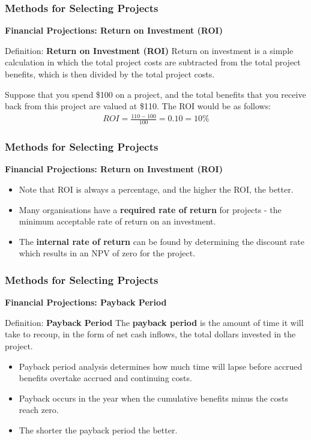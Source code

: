 \documentclass{beamer}
\begin{document}
\begin{frame}
\frametitle{Methods for Selecting Projects}
\textbf{Financial Projections: Return on Investment (ROI)}\\
\vspace{0.5cm}
\begin{block}{Definition: \textbf{Return on Investment (ROI)}}
Return on investment is a simple calculation in which the total project costs are subtracted from the total project benefits, which is then divided by the total project costs.
\end{block}
\vspace{0.5cm}
\begin{example}
Suppose that you spend \$100 on a project, and the total benefits that you receive back from this project are valued at \$110. The ROI would be as follows:
\begin{align*}
ROI = \frac{110 - 100}{100} = 0.10 = 10\%
\end{align*}
\end{example}
\end{frame}
\begin{frame}
\frametitle{Methods for Selecting Projects}
\textbf{Financial Projections: Return on Investment (ROI)}\\
\vspace{0.5cm}
\begin{itemize}
\item Note that ROI is always a percentage, and the higher the ROI, the better.
\item Many organisations have a \textbf{required rate of return} for projects - the minimum acceptable rate of return on an investment.
\item The \textbf{internal rate of return} can be found by determining the discount rate which results in an NPV of zero for the project.
\end{itemize}
\end{frame}
\begin{frame}
\frametitle{Methods for Selecting Projects}
\textbf{Financial Projections: Payback Period}\\
\vspace{0.5cm}
\begin{block}{Definition: \textbf{Payback Period}}
The \textbf{payback period} is the amount of time it will take to recoup, in the form of net cash inflows, the total dollars invested in the project.
\end{block}
\vspace{0.5cm}
\begin{itemize}
\item Payback period analysis determines how much time will lapse before accrued benefits overtake accrued and continuing costs.
\item Payback occurs in the year when the cumulative benefits minus the costs reach zero.
\item The shorter the payback period the better.
\end{itemize}
\end{frame}
\end{document}
